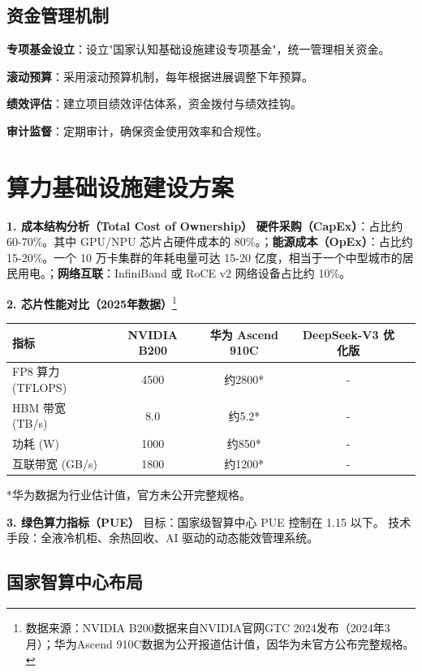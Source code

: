 \subsection{资金管理机制}

\textbf{专项基金设立}：设立"国家认知基础设施建设专项基金"，统一管理相关资金。

\textbf{滚动预算}：采用滚动预算机制，每年根据进展调整下年预算。

\textbf{绩效评估}：建立项目绩效评估体系，资金拨付与绩效挂钩。

\textbf{审计监督}：定期审计，确保资金使用效率和合规性。

\section{算力基础设施建设方案}

\textbf{1. 成本结构分析（Total Cost of Ownership）}
\textbf{硬件采购（CapEx）}：占比约 60-70\%。其中 GPU/NPU 芯片占硬件成本的 80\%。；\textbf{能源成本（OpEx）}：占比约 15-20\%。一个 10 万卡集群的年耗电量可达 15-20 亿度，相当于一个中型城市的居民用电。；\textbf{网络互联}：InfiniBand 或 RoCE v2 网络设备占比约 10\%。

\textbf{2. 芯片性能对比（2025年数据）}\footnote{数据来源：NVIDIA B200数据来自NVIDIA官网GTC 2024发布（2024年3月）；华为Ascend 910C数据为公开报道估计值，因华为未官方公布完整规格。}
\begin{table}[H]
\centering
\small
\begin{tabular}{lcccc}
\toprule
\textbf{指标} & \textbf{NVIDIA B200} & \textbf{华为 Ascend 910C} & \textbf{DeepSeek-V3 优化版} \\
\midrule
FP8 算力 (TFLOPS) & 4500 & 约2800* & - \\
HBM 带宽 (TB/s) & 8.0 & 约5.2* & - \\
功耗 (W) & 1000 & 约850* & - \\
互联带宽 (GB/s) & 1800 & 约1200* & - \\
\bottomrule
\end{tabular}
\end{table}
\small{*华为数据为行业估计值，官方未公开完整规格。}
\normalsize

\textbf{3. 绿色算力指标（PUE）}
目标：国家级智算中心 PUE 控制在 1.15 以下。 技术手段：全液冷机柜、余热回收、AI 驱动的动态能效管理系统。

\subsection{国家智算中心布局}

